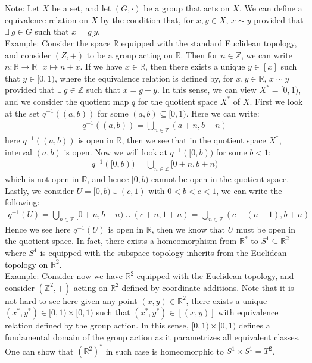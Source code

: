 \documentclass[11pt]{book}
\theoremstyle{break}
\theoremstyle{break}
\newcommand{\R}{\mathbb{R}}
\newcommand{\Z}{\mathbb{Z}}
\newcommand{\note}{\color{red}Note: \color{black}}
\newcommand{\example}{\color{green}Example: \color{black}}
\begin{document}
\note Let $X$ be a set, and let $(G,\cdot)$ be a group that acts on $X$. We can define a equivalence relation on $X$ by the condition that, for $x,y\in X$, $x\sim y$ provided that $\exists\ g\in G$ such that $x = g_\cdot y$. \\

\example Consider the space $\R$ equipped with the standard Euclidean topology, and consider $(Z,+)$ to be a group acting on $\R$. Then for $n \in \Z$, we can write $n:\R \to \R \ \ \ x\mapsto n+x$. If we have $x \in \R$, then there exists a unique $y \in [x]$ such that $y \in [0,1)$, where the equivalence relation is defined by, for $x,y\in \R$, $x\sim y$ provided that $\exists\ g\in \Z$ such that $x = g+ y$. In this sense, we can view $X^* = [0,1)$, and we consider the quotient map $q$ for the quotient space $X^*$ of $X$. First we look at the set $q^{-1}((a,b))$ for some $(a,b) \subseteq [0,1)$. Here we can write:
\begin{align*}
q^{-1}((a,b)) = \bigcup_{n\in \Z}(a+n, b+n)
\end{align*}
here $q^{-1}((a,b))$ is open in $\R$, then we see that in the quotient space $X^*$, interval $(a,b)$ is open. Now we will look at $q^{-1}([0,b))$ for some $b<1$:
\begin{align*}
q^{-1}([0,b)) = \bigcup_{n \in \Z}[0+n, b+n)
\end{align*}
which is not open in $\R$, and hence $[0,b)$ cannot be open in the quotient space. Lastly, we consider $U = [0,b)\cup (c,1)$ with $0<b<c<1$, we can write the following:
\begin{align*}
q^{-1}(U) = \bigcup_{n \in \Z}[0+n,b+n) \cup (c+n, 1+n) = \bigcup_{n\in \Z}(c+(n-1), b+n)
\end{align*} 
Hence we see here $q^{-1}(U)$ is open in $\R$, then we know that $U$ must be open in the quotient space. In fact, there exists a homeomorphism from $\R^*$ to $S^1 \subseteq \R^2$ where $S^1$ is equipped with the subspace topology inherits from the Euclidean topology on $\R^2$.\\

\example Consider now we have $\R^2$ equipped with the Euclidean topology, and consider $(\Z^2,+)$ acting on $\R^2$ defined by coordinate additions. Note that it is not hard to see here given any point $(x,y)\in \R^2$, there exists a unique $(x^*,y^*) \in [0,1)\times[0,1)$ such that $(x^*,y^*) \in [(x,y)]$ with equivalence relation defined by the group action. In this sense, $[0,1) \times [0,1)$ defines a fundamental domain of the group action as it parametrizes all equivalent classes. One can show that $(\R^2)^*$ in such case is homeomorphic to $S^1 \times S^1  = T^2$. \\
\end{document}
